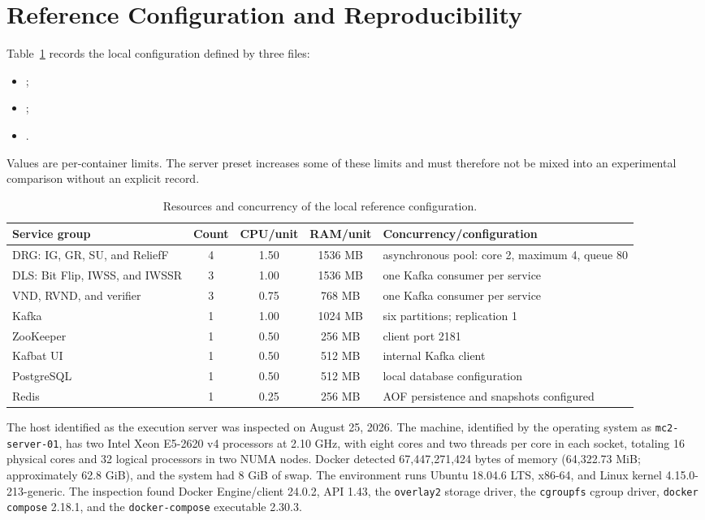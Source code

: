 \section{Reference Configuration and Reproducibility}

Table~\ref{tab:container-resources} records the local configuration defined by three files:
\begin{itemize}
  \item {};
  \item {};
  \item {}.
\end{itemize}
Values are per-container limits. The server preset increases some of these limits and must therefore not be mixed into an experimental comparison without an explicit record.

\begin{table}[!htb]
  \centering
  \scriptsize
  \caption{Resources and concurrency of the local reference configuration.}
  \label{tab:container-resources}
  \begin{tabularx}{\linewidth}{@{}Xc c c X@{}}
    \toprule
    \textbf{Service group} & \textbf{Count} & \textbf{CPU/unit} & \textbf{RAM/unit} & \textbf{Concurrency/configuration} \\
    \midrule
    DRG: IG, GR, SU, and ReliefF & 4 & 1.50 & 1536 MB & asynchronous pool: core 2, maximum 4, queue 80 \\
    DLS: Bit Flip, IWSS, and IWSSR & 3 & 1.00 & 1536 MB & one Kafka consumer per service \\
    VND, RVND, and verifier & 3 & 0.75 & 768 MB & one Kafka consumer per service \\
    Kafka & 1 & 1.00 & 1024 MB & six partitions; replication 1 \\
    ZooKeeper & 1 & 0.50 & 256 MB & client port 2181 \\
    Kafbat UI & 1 & 0.50 & 512 MB & internal Kafka client \\
    PostgreSQL & 1 & 0.50 & 512 MB & local database configuration \\
    Redis & 1 & 0.25 & 256 MB & AOF persistence and snapshots configured \\
    \bottomrule
  \end{tabularx}
\end{table}

The host identified as the execution server was inspected on August 25, 2026. The machine, identified by the operating system as \texttt{mc2-server-01}, has two Intel Xeon E5-2620 v4 processors at 2.10 GHz, with eight cores and two threads per core in each socket, totaling 16 physical cores and 32 logical processors in two NUMA nodes. Docker detected 67,447,271,424 bytes of memory (64,322.73 MiB; approximately 62.8 GiB), and the system had 8 GiB of swap. The environment runs Ubuntu 18.04.6 LTS, x86-64, and Linux kernel 4.15.0-213-generic. The inspection found Docker Engine/client 24.0.2, API 1.43, the \texttt{overlay2} storage driver, the \texttt{cgroupfs} cgroup driver, \texttt{docker compose} 2.18.1, and the \texttt{docker-compose} executable 2.30.3.

